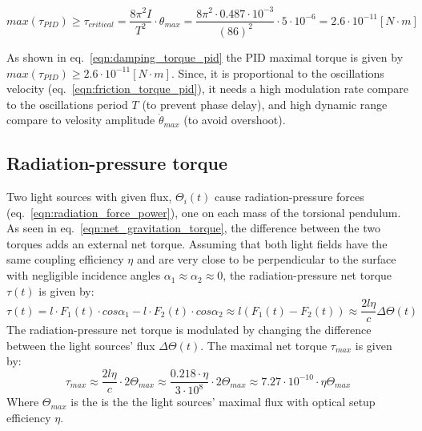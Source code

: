 \documentclass[\main/master.tex]{subfiles}
\begin{document}
\begin{equation}
max(\tau_{PID}) \geq  \tau_{critical} = \frac{ 8 \pi^2 I }{T^2}\cdot\theta_{max} = \frac{ 8 \pi^2 \cdot 0.487\cdot10^{-3} }{(86)^2}\cdot 5\cdot10^{-6} = 2.6\cdot10^{-11}[N\cdot m]
\label{eqn:damping_torque_pid}
\end{equation}
\par\noindent
As shown in  eq.~\ref{eqn:damping_torque_pid} the PID maximal torque is given by $max(\tau_{PID}) \geq 2.6\cdot10^{-11}[N\cdot m]$. Since, it is proportional to the oscillations velocity (eq.~\ref{eqn:friction_torque_pid}), it needs a high modulation rate compare to the oscillations period $T$ (to prevent phase delay), and high dynamic range compare to velosity amplitude $\dot{\theta}_{max}$ (to avoid overshoot). 
\subsection{Radiation-pressure torque}
Two light sources with given flux, $\Theta_i(t)$ cause radiation-pressure forces (eq.~\ref{eqn:radiation_force_power}), one on each mass of the torsional pendulum. As seen in eq.~\ref{eqn:net_gravitation_torque}, the difference between the two torques adds an external net torque. Assuming that both light fields have the same coupling efficiency $\eta$ and are very close to be perpendicular to the surface with negligible incidence angles $\alpha_1\approx\alpha_2\approx 0$, the radiation-pressure net torque $\tau(t)$ is given by:  
\begin{equation}
\tau(t) = l\cdot F_1(t) \cdot cos\alpha_1 - l\cdot F_2(t) \cdot cos\alpha_2\approx l(F_1(t) - F_2(t)) \approx \frac{2l\eta}{{c}} \Delta \Theta(t) \label{eqn:radiation torque}
\end{equation}
The radiation-pressure net torque is modulated by changing the difference between the light sources' flux $\Delta \Theta(t)$. The maximal net torque $\tau_{max}$ is given by: 
\begin{equation}
\tau_{max}  \approx \frac{2l\eta}{{c}} \cdot 2 \Theta_{max} \approx \frac{0.218\cdot \eta}{{3\cdot10^{8}}} \cdot 2 \Theta_{max} \approx 7.27\cdot10^{-10} \cdot \eta\Theta_{max}   \label{eqn:max radiation torque}
\end{equation}
Where $\Theta_{max}$ is the is the the light sources' maximal flux with optical setup efficiency $\eta$. 
\end{document}
